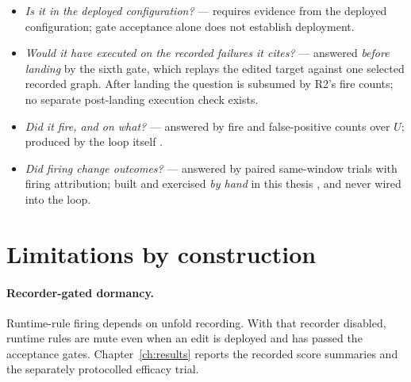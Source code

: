 \begin{itemize}
  \item[\textbf{R0}] \emph{Is it in the deployed configuration?} ---
        requires evidence from the deployed configuration; gate acceptance alone
        does not establish deployment.
  \item[\textbf{R1}] \emph{Would it have executed on the recorded failures
        it cites?} --- answered \emph{before landing} by the sixth gate,
        which replays the edited target against one selected recorded graph. After landing the question is
        subsumed by R2's fire counts; no separate post-landing execution
        check exists.
  \item[\textbf{R2}] \emph{Did it fire, and on what?} --- answered by fire
        and false-positive counts over $U$; produced by the loop itself
        .
  \item[\textbf{R3}] \emph{Did firing change outcomes?} --- answered by
        paired same-window trials with firing attribution; built and
        exercised \emph{by hand} in this thesis , and never
        wired into the loop.
\end{itemize}


\section{Limitations by construction}
\label{sec:construction-limits}


\paragraph{Recorder-gated dormancy.} Runtime-rule firing depends on unfold
recording. With that recorder disabled, runtime rules are mute even when an
edit is deployed and has passed the acceptance gates. Chapter~\ref{ch:results}
reports the recorded score summaries and the separately protocolled
efficacy trial.
